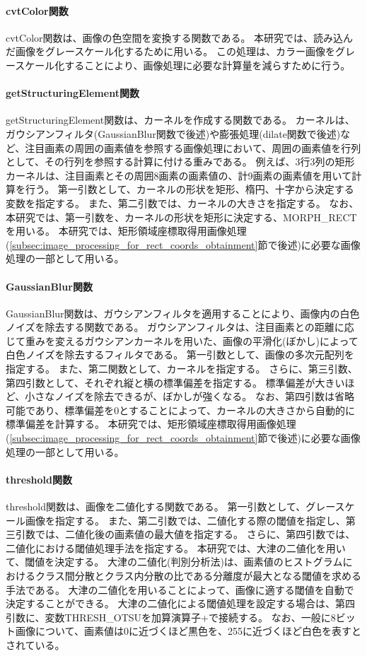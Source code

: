 \paragraph{cvtColor関数}
cvtColor関数は、画像の色空間を変換する関数である。
本研究では、読み込んだ画像をグレースケール化するために用いる。
この処理は、カラー画像をグレースケール化することにより、画像処理に必要な計算量を減らすために行う。

\paragraph{getStructuringElement関数}
getStructuringElement関数は、カーネルを作成する関数である\cite{getStructuringElement関数}。
カーネルは、ガウシアンフィルタ(GaussianBlur関数で後述)や膨張処理(dilate関数で後述)など、注目画素の周囲の画素値を参照する画像処理において、周囲の画素値を行列として、その行列を参照する計算に付ける重みである。
例えば、3行3列の矩形カーネルは、注目画素とその周囲8画素の画素値の、計9画素の画素値を用いて計算を行う。
第一引数として、カーネルの形状を矩形、楕円、十字から決定する変数を指定する。
また、第二引数では、カーネルの大きさを指定する。
なお、本研究では、第一引数を、カーネルの形状を矩形に決定する、MORPH\_RECTを用いる。
本研究では、矩形領域座標取得用画像処理(\ref{subsec:image_processing_for_rect_coords_obtainment}節で後述)に必要な画像処理の一部として用いる。

\paragraph{GaussianBlur関数}
GaussianBlur関数は、ガウシアンフィルタを適用することにより、画像内の白色ノイズを除去する関数である。
ガウシアンフィルタは、注目画素との距離に応じて重みを変えるガウシアンカーネルを用いた、画像の平滑化(ぼかし)によって白色ノイズを除去するフィルタである。
第一引数として、画像の多次元配列を指定する。
また、第二関数として、カーネルを指定する。
さらに、第三引数、第四引数として、それぞれ縦と横の標準偏差を指定する。
標準偏差が大きいほど、小さなノイズを除去できるが、ぼかしが強くなる。
なお、第四引数は省略可能であり、標準偏差を$0$とすることによって、カーネルの大きさから自動的に標準偏差を計算する\cite{ガウシアンフィルタ}。
本研究では、矩形領域座標取得用画像処理(\ref{subsec:image_processing_for_rect_coords_obtainment}節で後述)に必要な画像処理の一部として用いる。

\paragraph{threshold関数}
threshold関数は、画像を二値化する関数である。
第一引数として、グレースケール画像を指定する。
また、第二引数では、二値化する際の閾値を指定し、第三引数では、二値化後の画素値の最大値を指定する。
さらに、第四引数では、二値化における閾値処理手法を指定する。
本研究では、大津の二値化を用いて、閾値を決定する。
大津の二値化(判別分析法)は、画素値のヒストグラムにおけるクラス間分散とクラス内分散の比である分離度が最大となる閾値を求める手法である\cite{大津の二値化}。
大津の二値化を用いることによって、画像に適する閾値を自動で決定することができる。
大津の二値化による閾値処理を設定する場合は、第四引数に、変数THRESH\_OTSUを加算演算子+で接続する。
なお、一般に8ビット画像について、画素値は0に近づくほど黒色を、255に近づくほど白色を表すとされている\cite{画素値}。

